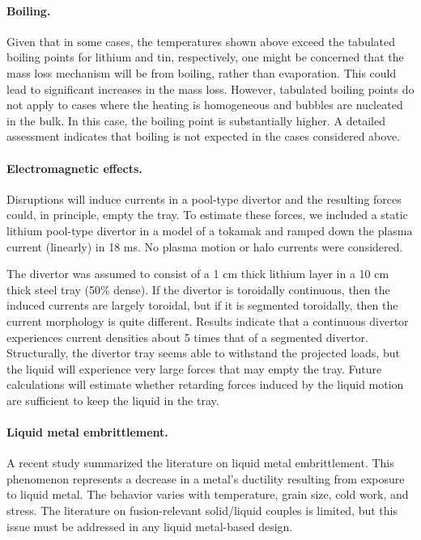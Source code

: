 \paragraph{Boiling. } Given that in some cases, the temperatures shown
above exceed the tabulated boiling points for lithium and tin, respectively,
one might be concerned that the mass loss mechanism will be from boiling,
rather than evaporation. This could lead to significant increases in the mass
loss. However, tabulated boiling points do not apply to cases where the
heating is homogeneous and bubbles are nucleated in the bulk. In this case,
the boiling point is substantially higher. A detailed assessment indicates
that boiling is not expected in the cases considered above.

\paragraph{Electromagnetic effects. } Disruptions will induce currents in
a pool-type divertor and the resulting forces could, in principle, empty the
tray. To estimate these forces, we included a static lithium pool-type
divertor in a model of a tokamak and ramped down the plasma current (linearly)
in 18 ms. No plasma motion or halo currents were considered.

The divertor was assumed to consist of a 1 cm thick lithium layer in a 10 cm
thick steel tray (50\% dense). If the divertor is toroidally continuous, then
the induced currents are largely toroidal, but if it is segmented toroidally,
then the current morphology is quite different. Results indicate that a
continuous divertor experiences current densities about 5 times that of a
segmented divertor. Structurally, the divertor tray seems able to withstand
the projected loads, but the liquid will experience very large forces that may
empty the tray. Future calculations will estimate whether retarding forces
induced by the liquid motion are sufficient to keep the liquid in the tray.

\paragraph{Liquid metal embrittlement. } A recent study summarized the
literature on liquid metal embrittlement. This phenomenon represents a
decrease in a metal’s ductility resulting from exposure to liquid metal. The
behavior varies with temperature, grain size, cold work, and stress. The
literature on fusion-relevant solid/liquid couples is limited, but this issue
must be addressed in any liquid metal-based design.

